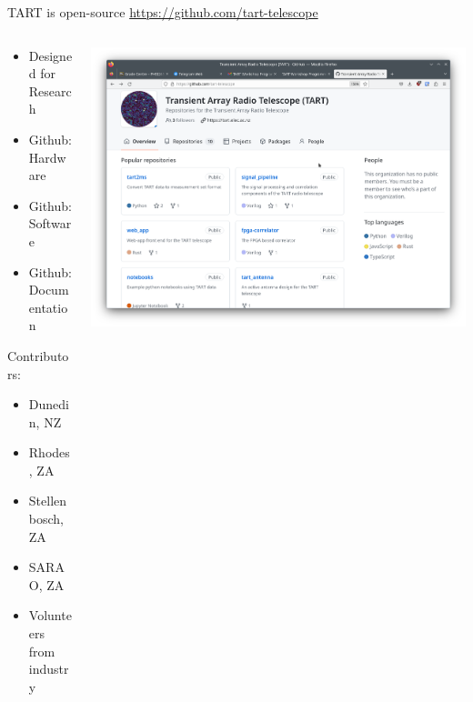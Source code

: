 \documentclass[ignorenonframetext]{beamer}
\begin{document}
\begin{frame}{TART is open-source}
  \centering\url{https://github.com/tart-telescope}
 \begin{columns}
  \begin{column}{0.4\linewidth}
    \begin{itemize}
      \item Designed for Research
      \item Github: Hardware
      \item Github: Software
      \item Github: Documentation
    \end{itemize}
    
    Contributors:
    \begin{itemize}
      \item Dunedin, NZ
      \item Rhodes, ZA
      \item Stellenbosch, ZA
      \item SARAO, ZA
      \item Volunteers from industry
    \end{itemize}
  \end{column}
  \begin{column}{0.6\linewidth}
    \includegraphics[width=\linewidth]{fig/screenshot_github.png}
  \end{column}
  \end{columns}
\end{frame}
\end{document}
